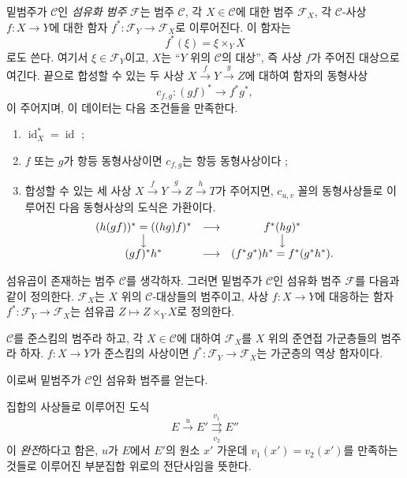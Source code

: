  밑범주가 $\mathcal C$인 \emph{섬유화 범주}
$\mathcal F$는 범주 $\mathcal C$, 각
$X\in\mathcal C$에 대한 범주 $\mathcal F_X$, 각
$\mathcal C$-사상 $f:X\longrightarrow Y$에 대한 함자
$f^*:\mathcal F_Y\longrightarrow\mathcal F_X$로 이루어진다. 이 함자는
\[
  f^*(\xi)=\xi\times_Y X
\]
로도 쓴다. 여기서 $\xi\in\mathcal F_Y$이고, $X$는 ``$Y$ 위의
$\mathcal C$의 대상'', 즉 사상 $f$가 주어진 대상으로 여긴다. 끝으로
합성할 수 있는 두 사상
$X\xrightarrow{f}Y\xrightarrow{g}Z$에 대하여 함자의 동형사상
\[
  c_{f,g}:(gf)^*\longrightarrow f^*g^*,
\]
이 주어지며, 이 데이터는 다음 조건들을 만족한다.

\begin{enumerate}
\item[(i)] $\operatorname{id}_X^*=\operatorname{id}$ ;
\item[(ii)] $f$ 또는 $g$가 항등 동형사상이면 $c_{f,g}$는
항등 동형사상이다 ;
\item[(iii)] 합성할 수 있는 세 사상
$X\xrightarrow{f}Y\xrightarrow{g}Z\xrightarrow{h}T$가 주어지면,
$c_{u,v}$ 꼴의 동형사상들로 이루어진 다음 동형사상의 도식은
가환이다.
\[
\begin{array}{ccc}
  (h(gf))^*=((hg)f)^* & \longrightarrow & f^*(hg)^* \\
  \big\downarrow && \big\downarrow \\
  (gf)^*h^* & \longrightarrow & (f^*g^*)h^*=f^*(g^*h^*).
\end{array}
\]
\end{enumerate}

 섬유곱이 존재하는 범주 $\mathcal C$를 생각하자.
그러면 밑범주가 $\mathcal C$인 섬유화 범주 $\mathcal F$를 다음과 같이
정의한다. $\mathcal F_X$는 $X$ 위의 $\mathcal C$-대상들의 범주이고,
사상 $f:X\longrightarrow Y$에 대응하는 함자
$f^*:\mathcal F_Y\longrightarrow\mathcal F_X$는 섬유곱
$Z\longmapsto Z\times_YX$로 정의한다.

 $\mathcal C$를 준스킴의 범주라 하고, 각
$X\in\mathcal C$에 대하여 $\mathcal F_X$를 $X$ 위의 준연접
가군층들의 범주라 하자. $f:X\longrightarrow Y$가 준스킴의 사상이면
$f^*:\mathcal F_Y\longrightarrow\mathcal F_X$는 가군층의
역상 함자이다.

이로써 밑범주가 $\mathcal C$인 섬유화 범주를 얻는다.

 집합의 사상들로 이루어진 도식
\[
  E\xrightarrow{u}E'
  \overset{v_1}{\underset{v_2}{\rightrightarrows}}E''
\]
이 \emph{완전}하다고 함은, $u$가 $E$에서 $E'$의 원소 $x'$ 가운데
$v_1(x')=v_2(x')$를 만족하는 것들로 이루어진 부분집합 위로의
전단사임을 뜻한다.

